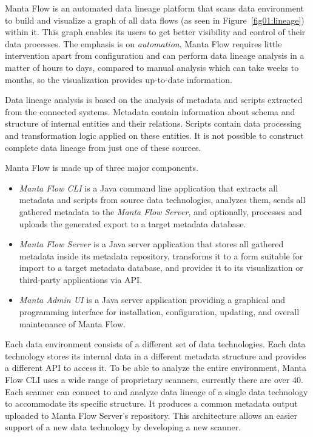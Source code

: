 Manta Flow is an automated data lineage platform that scans data environment to build and visualize a graph of all data flows (as seen in Figure~\ref{fig01:lineage}) within it. This graph enables its users to get better visibility and control of their data processes. The emphasis is on \textit{automation}, Manta Flow requires little intervention apart from configuration and can perform data lineage analysis in a matter of hours to days, compared to manual analysis which can take weeks to months, so the visualization provides up-to-date information.
\par
Data lineage analysis is based on the analysis of metadata and scripts extracted from the connected systems. Metadata contain information about schema and structure of internal entities and their relations. Scripts contain data processing and transformation logic applied on these entities. It is not possible to construct complete data lineage from just one of these sources.
\par
Manta Flow is made up of three major components.
\begin{itemize}
    \item \textit{Manta Flow CLI} is a Java command line application that extracts all metadata and scripts from source data technologies, analyzes them, sends all gathered metadata to the \textit{Manta Flow Server}, and optionally, processes and uploads the generated export to a target metadata database.
    \item \textit{Manta Flow Server} is a Java server application that stores all gathered metadata inside its metadata repository, transforms it to a form suitable for import to a target metadata database, and provides it to its visualization or third-party applications via API.
    \item \textit{Manta Admin UI} is a Java server application providing a graphical and programming interface for installation, configuration, updating, and overall maintenance of Manta Flow.
\end{itemize}
\par
Each data environment consists of a different set of data technologies. Each data technology stores its internal data in a different metadata structure and provides a different API to access it. To be able to analyze the entire environment, Manta Flow CLI uses a wide range of proprietary scanners, currently there are over 40. Each scanner can connect to and analyze data lineage of a single data technology to accommodate its specific structure. It produces a common metadata output uploaded to Manta Flow Server's repository. This architecture allows an easier support of a new data technology by developing a new scanner.

